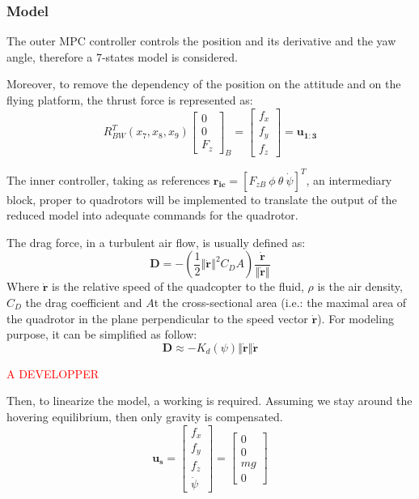\documentclass[a4paper, 12pt]{report}
\begin{document}
\subsubsection{Model}
The outer MPC controller controls the position and its derivative and the yaw angle, therefore a 7-states model is considered. 

Moreover, to remove the dependency of the position on the attitude and on the flying platform, the thrust force is represented as:
\[ R_{BW}^T(x_7, x_8, x_9) \begin{bmatrix}  0\\ 0\\ F_z \end{bmatrix}_B = \begin{bmatrix}  f_x\\ f_y\\ f_z \end{bmatrix} = \boldsymbol{u_{1:3}}\]

The inner controller, taking as references $\boldsymbol{r_{ic}} = [F_{zB} \ \phi \  \theta \ \dot \psi]^T$, an intermediary block, proper to quadrotors will be implemented to translate the output of the reduced model into adequate commands for the quadrotor.

The drag force, in a turbulent air flow, is usually defined as:
\[ \boldsymbol{D} = -(\frac{1}{2} \left\Vert \boldsymbol{\dot r} \right\Vert^2 C_D A) \frac{\boldsymbol{\dot r}}{\left\Vert \boldsymbol{\dot r} \right\Vert}\]
Where $\boldsymbol{\dot r}$ is the relative speed of the quadcopter to the fluid, $\rho$ is the air density, $C_D$  the drag coefficient and $A$t the cross-sectional area (i.e.: the maximal area of the quadrotor in the plane perpendicular to the speed vector $\boldsymbol{\dot r}$). For modeling purpose, it can be simplified as follow:
\[ \boldsymbol{D} \approx -K_d(\psi) \left\Vert \boldsymbol{\dot r} \right\Vert \boldsymbol{\dot r}\]

\textcolor{red}{A DEVELOPPER}

Then, to linearize the model, a working is required. Assuming we stay around the hovering equilibrium, then only gravity is compensated.
\[ \boldsymbol{u_s} = \begin{bmatrix} f_x \\ f_y \\ f_z \\ \dot \psi \end{bmatrix} = \begin{bmatrix}  0\\ 0\\ mg \\ 0\end{bmatrix} \]
\end{document}
